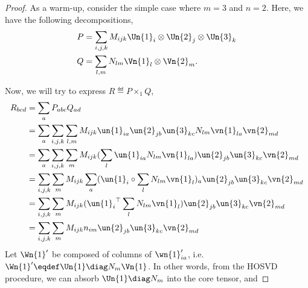 \begin{proof}
  As a warm-up, consider the simple case where $m = 3$ and $n = 2$.
  Here, we have the following decompositions,
  \begin{align*}
    P &= \sum_{i,j,k} M_{ijk} \Un{1}_{i} \otimes \Un{2}_{j} \otimes \Un{3}_{k} \\
    Q &= \sum_{l,m} N_{lm} \Vn{1}_{l} \otimes \Vn{2}_{m}.
  \end{align*}

  Now, we will try to express $R \eqdef P \times_{1} Q$,
  \begin{align*}
    R_{bcd} &= \sum_{a} P_{abc} Q_{ad} \\
    &= \sum_{a} \sum_{i,j,k} \sum_{l,m} M_{ijk} \un{1}_{ia} \un{2}_{jb} \un{3}_{kc} 
                N_{lm} \vn{1}_{la} \vn{2}_{md} \\
                &= \sum_{a} \sum_{i,j,k} \sum_{m} M_{ijk} (\sum_{l} \un{1}_{ia} N_{lm} \vn{1}_{la}) 
                    \un{2}_{jb} \un{3}_{kc} \vn{2}_{md} \\
                    &= \sum_{i,j,k} \sum_{m} M_{ijk} 
                      \sum_{a} (\un{1}_{i} \circ \sum_{l} N_{lm} \vn{1}_{l})_{a}
                    \un{2}_{jb} \un{3}_{kc} \vn{2}_{md} \\
                    &= \sum_{i,j,k} \sum_{m} M_{ijk} 
                    ({\un{1}_{i}}^\top \sum_{l} N_{lm} \vn{1}_{l}) \un{2}_{jb} \un{3}_{kc} \vn{2}_{md} \\
                    &= \sum_{i,j,k} \sum_{m} M_{ijk} n_{im} \un{2}_{jb} \un{3}_{kc} \vn{2}_{md} \\
  \end{align*}
  Let ${\Wn{1}}'$ be composed of columns of ${\wn{1}}'_{ia}$, i.e.
  ${\Wn{1}}' \eqdef \Un{1} \diag N_m \Vn{1}$. 
  In other words, from the HOSVD procedure, we can absorb $\Un{1} \diag N_m$ into the core tensor, and 


\end{proof}



